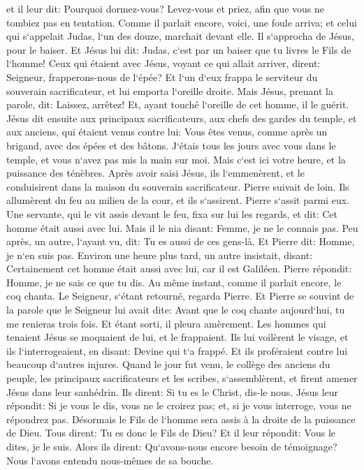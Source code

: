 \verse et il leur dit: Pourquoi dormez-vous? Levez-vous et priez, afin que vous ne tombiez pas en tentation. 
\verse Comme il parlait encore, voici, une foule arriva; et celui qui s`appelait Judas, l`un des douze, marchait devant elle. Il s`approcha de Jésus, pour le baiser. 
\verse Et Jésus lui dit: Judas, c`est par un baiser que tu livres le Fils de l`homme! 
\verse Ceux qui étaient avec Jésus, voyant ce qui allait arriver, dirent: Seigneur, frapperons-nous de l`épée? 
\verse Et l`un d`eux frappa le serviteur du souverain sacrificateur, et lui emporta l`oreille droite. 
\verse Mais Jésus, prenant la parole, dit: Laissez, arrêtez! Et, ayant touché l`oreille de cet homme, il le guérit. 
\verse Jésus dit ensuite aux principaux sacrificateurs, aux chefs des gardes du temple, et aux anciens, qui étaient venus contre lui: Vous êtes venus, comme après un brigand, avec des épées et des bâtons. 
\verse J`étais tous les jours avec vous dans le temple, et vous n`avez pas mis la main sur moi. Mais c`est ici votre heure, et la puissance des ténèbres. 
\verse Après avoir saisi Jésus, ils l`emmenèrent, et le conduisirent dans la maison du souverain sacrificateur. Pierre suivait de loin. 
\verse Ils allumèrent du feu au milieu de la cour, et ils s`assirent. Pierre s`assit parmi eux. 
\verse Une servante, qui le vit assis devant le feu, fixa sur lui les regards, et dit: Cet homme était aussi avec lui. 
\verse Mais il le nia disant: Femme, je ne le connais pas. 
\verse Peu après, un autre, l`ayant vu, dit: Tu es aussi de ces gens-là. Et Pierre dit: Homme, je n`en suis pas. 
\verse Environ une heure plus tard, un autre insistait, disant: Certainement cet homme était aussi avec lui, car il est Galiléen. 
\verse Pierre répondit: Homme, je ne sais ce que tu dis. Au même instant, comme il parlait encore, le coq chanta. 
\verse Le Seigneur, s`étant retourné, regarda Pierre. Et Pierre se souvint de la parole que le Seigneur lui avait dite: Avant que le coq chante aujourd`hui, tu me renieras trois fois. 
\verse Et étant sorti, il pleura amèrement. 
\verse Les hommes qui tenaient Jésus se moquaient de lui, et le frappaient. 
\verse Ils lui voilèrent le visage, et ils l`interrogeaient, en disant: Devine qui t`a frappé. 
\verse Et ils proféraient contre lui beaucoup d`autres injures. 
\verse Quand le jour fut venu, le collège des anciens du peuple, les principaux sacrificateurs et les scribes, s`assemblèrent, et firent amener Jésus dans leur sanhédrin. 
\verse Ils dirent: Si tu es le Christ, dis-le nous. Jésus leur répondit: Si je vous le dis, vous ne le croirez pas; 
\verse et, si je vous interroge, vous ne répondrez pas. 
\verse Désormais le Fils de l`homme sera assis à la droite de la puissance de Dieu. 
\verse Tous dirent: Tu es donc le Fils de Dieu? Et il leur répondit: Vous le dites, je le suis. 
\verse Alors ils dirent: Qu`avons-nous encore besoin de témoignage? Nous l`avons entendu nous-mêmes de sa bouche. 

